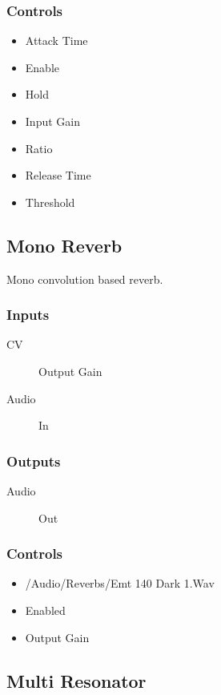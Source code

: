 \subsubsection{Controls}
\begin{itemize}
\item Attack Time
\item Enable
\item Hold
\item Input Gain
\item Ratio
\item Release Time
\item Threshold
\end{itemize}

\subsection{Mono Reverb}

Mono convolution based reverb.



\subsubsection{Inputs}
\begin{description}
\item [CV] Output Gain
\item [Audio] In
\end{description}

\subsubsection{Outputs}
\begin{description}
\item [Audio] Out
\end{description}

\subsubsection{Controls}
\begin{itemize}
\item /Audio/Reverbs/Emt 140 Dark 1.Wav
\item Enabled
\item Output Gain
\end{itemize}

\subsection{Multi Resonator}

